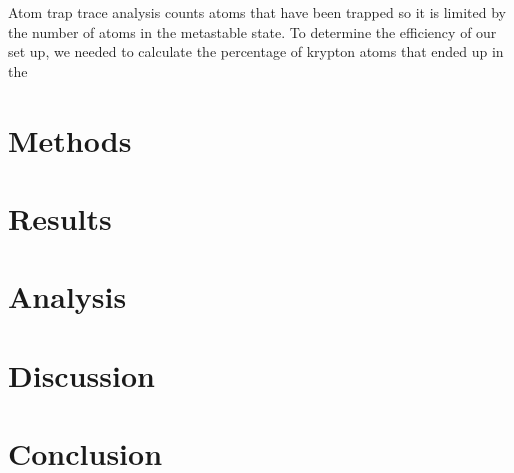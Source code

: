 \documentclass[prb,preprint]{revtex4-1}
\begin{document}
Atom trap trace analysis counts atoms that have been trapped so it is limited by the number of atoms in the metastable state. To determine the efficiency of our set up, we needed to calculate the percentage of krypton atoms that ended up in the 

\section{Methods}


\section{Results}

 
\section{Analysis}


\section{Discussion}


\section{Conclusion}



\begin{thebibliography}{0}



\end{thebibliography}
\end{document}
